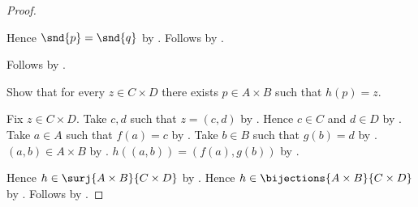 \begin{proof}
\begin{subproof}
\begin{subproof}
            Hence $\snd{p}=\snd{q}$ by .
            Follows by
                .
        \end{subproof}
        Follows by .
    \end{subproof}
    Show that for every $z\in C\times D$ there exists $p\in A\times B$
        such that $h(p)=z$.
    \begin{subproof}
        Fix $z\in C\times D$.
        Take $c,d$ such that $z=(c,d)$
            by .
        Hence $c\in C$ and $d\in D$ by .
        Take $a\in A$ such that $f(a)=c$ by .
        Take $b\in B$ such that $g(b)=d$ by .
        $(a,b)\in A\times B$ by .
        $h((a,b))=(f(a),g(b))$
            by .
    \end{subproof}
    Hence $h\in\surj{A\times B}{C\times D}$ by .
    Hence $h\in\bijections{A\times B}{C\times D}$
        by .
    Follows by .
\end{proof}

